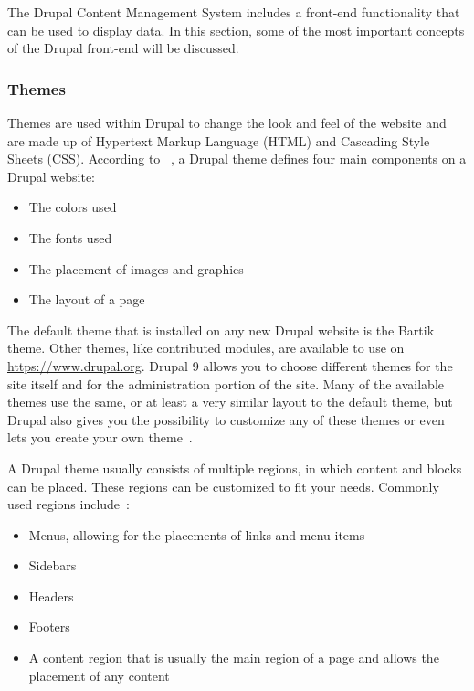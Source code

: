 The Drupal Content Management System includes a front-end functionality that can be used to display data. In this section, some of the most important concepts of the Drupal front-end will be discussed.

\subsubsection{Themes}

Themes are used within Drupal to change the look and feel of the website and are made up of Hypertext Markup Language (HTML) and Cascading Style Sheets (CSS). According to ~\textcite{Tomlinson2015}, a Drupal theme defines four main components on a Drupal website: 

\begin{itemize}
	\item  The colors used
	\item  The fonts used
	\item  The placement of images and graphics
	\item  The layout of a page
\end{itemize}

The default theme that is installed on any new Drupal website is the Bartik theme. Other themes, like contributed modules, are available to use on \url{https://www.drupal.org}. Drupal 9 allows you to choose different themes for the site itself and for the administration portion of the site. Many of the available themes use the same, or at least a very similar layout to the default theme, but Drupal also gives you the possibility to customize any of these themes or even lets you create your own theme~\autocite{Tomlinson2015}.

A Drupal theme usually consists of multiple regions, in which content and blocks can be placed. These regions can be customized to fit your needs. Commonly used regions include~\autocite{Tomlinson2015}: 
\begin{itemize}
	\item  Menus, allowing for the placements of links and menu items
	\item  Sidebars
	\item  Headers
	\item  Footers
	\item  A content region that is usually the main region of a page and allows the placement of any content
\end{itemize}

